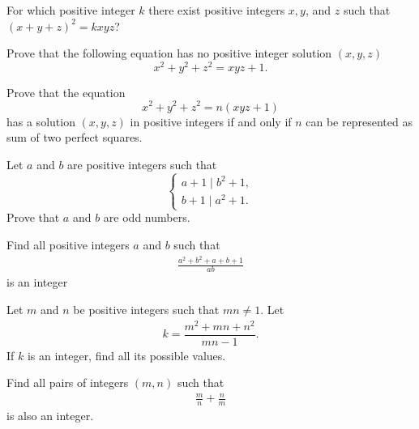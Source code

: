 \documentclass{subfile}
\begin{document}
	\begin{problem}[Mongolia 2000] %
		For which positive integer $k$ there exist positive integers $x,y$, and $z$ such that $(x+y+z)^2= kxyz$?
	\end{problem}

	\begin{problem} %
		Prove that the following equation has no positive integer solution $(x,y,z)$ \[x^2+y^2+z^2=xyz+1.\]
	\end{problem}

	\begin{problem} %
		Prove that the equation \[x^2+y^2+z^2=n(xyz+1)\] has a solution $(x,y,z)$ in positive integers if and only if $n$ can be represented as sum of two perfect squares.
	\end{problem}

	\begin{problem} %
		Let $a$ and $b$ are positive integers such that \[\left\{ \begin{array}{l} a + 1\mid {b^2} + 1,\\ b + 1\mid{a^2} + 1. \end{array} \right.\] Prove that $a$ and $b$ are odd numbers.
	\end{problem}

	\begin{problem} %
		Find all positive integers $a$ and $b$ such that
			\begin{align*}
				 \frac{a^2+b^2+a+b+1}{ab}
			\end{align*}
		is an integer
	\end{problem}
	
	\begin{problem} %
		Let $m$ and $n$ be positive integers such that $mn \neq 1$. Let
			\begin{align*}
				k= \dfrac{m^2+mn+n^2}{mn-1}.
			\end{align*}
		If $k$ is an integer, find all its possible values.
	\end{problem}

	\begin{problem}
		Find all pairs of integers $( m, n )$ such that 
			\begin{align*}
				 \frac{ m } { n } + \frac{ n}{m}
			\end{align*}
		is also an integer.
	\end{problem}
\end{document}

